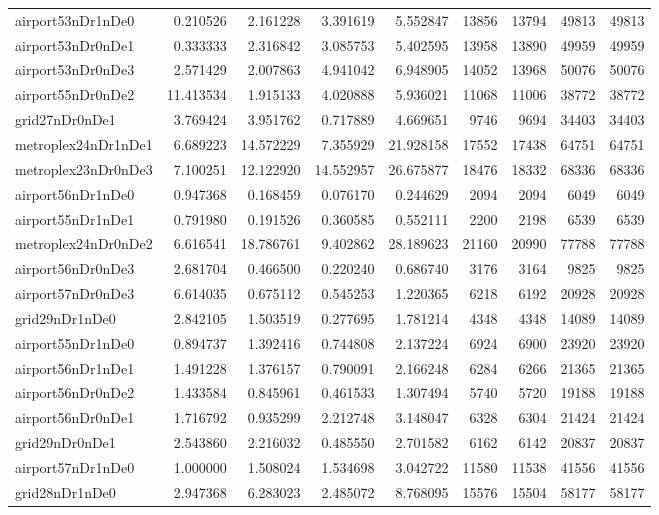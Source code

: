 \begin{longtable}{|l|r|r|r|r|r|r|r|r|}
airport53nDr1nDe0 & 0.210526 & 2.161228 & 3.391619 & 5.552847 & 13856 & 13794 & 49813 & 49813 \\
airport53nDr0nDe1 & 0.333333 & 2.316842 & 3.085753 & 5.402595 & 13958 & 13890 & 49959 & 49959 \\
airport53nDr0nDe3 & 2.571429 & 2.007863 & 4.941042 & 6.948905 & 14052 & 13968 & 50076 & 50076 \\
airport55nDr0nDe2 & 11.413534 & 1.915133 & 4.020888 & 5.936021 & 11068 & 11006 & 38772 & 38772 \\
grid27nDr0nDe1 & 3.769424 & 3.951762 & 0.717889 & 4.669651 & 9746 & 9694 & 34403 & 34403 \\
metroplex24nDr1nDe1 & 6.689223 & 14.572229 & 7.355929 & 21.928158 & 17552 & 17438 & 64751 & 64751 \\
metroplex23nDr0nDe3 & 7.100251 & 12.122920 & 14.552957 & 26.675877 & 18476 & 18332 & 68336 & 68336 \\
airport56nDr1nDe0 & 0.947368 & 0.168459 & 0.076170 & 0.244629 & 2094 & 2094 & 6049 & 6049 \\
airport55nDr1nDe1 & 0.791980 & 0.191526 & 0.360585 & 0.552111 & 2200 & 2198 & 6539 & 6539 \\
metroplex24nDr0nDe2 & 6.616541 & 18.786761 & 9.402862 & 28.189623 & 21160 & 20990 & 77788 & 77788 \\
airport56nDr0nDe3 & 2.681704 & 0.466500 & 0.220240 & 0.686740 & 3176 & 3164 & 9825 & 9825 \\
airport57nDr0nDe3 & 6.614035 & 0.675112 & 0.545253 & 1.220365 & 6218 & 6192 & 20928 & 20928 \\
grid29nDr1nDe0 & 2.842105 & 1.503519 & 0.277695 & 1.781214 & 4348 & 4348 & 14089 & 14089 \\
airport55nDr1nDe0 & 0.894737 & 1.392416 & 0.744808 & 2.137224 & 6924 & 6900 & 23920 & 23920 \\
airport56nDr1nDe1 & 1.491228 & 1.376157 & 0.790091 & 2.166248 & 6284 & 6266 & 21365 & 21365 \\
airport56nDr0nDe2 & 1.433584 & 0.845961 & 0.461533 & 1.307494 & 5740 & 5720 & 19188 & 19188 \\
airport56nDr0nDe1 & 1.716792 & 0.935299 & 2.212748 & 3.148047 & 6328 & 6304 & 21424 & 21424 \\
grid29nDr0nDe1 & 2.543860 & 2.216032 & 0.485550 & 2.701582 & 6162 & 6142 & 20837 & 20837 \\
airport57nDr1nDe0 & 1.000000 & 1.508024 & 1.534698 & 3.042722 & 11580 & 11538 & 41556 & 41556 \\
grid28nDr1nDe0 & 2.947368 & 6.283023 & 2.485072 & 8.768095 & 15576 & 15504 & 58177 & 58177 \\

\end{longtable}
